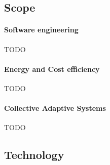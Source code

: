 \documentclass[12pt]{article}
\begin{document}
\subsection{Scope}\label{subsec:scope}

\paragraph{Software engineering}
TODO

\paragraph{Energy and Cost efficiency}
TODO

\paragraph{Collective Adaptive Systems}
TODO

\subsection{Technology}\label{subsec:technology}
\end{document}
